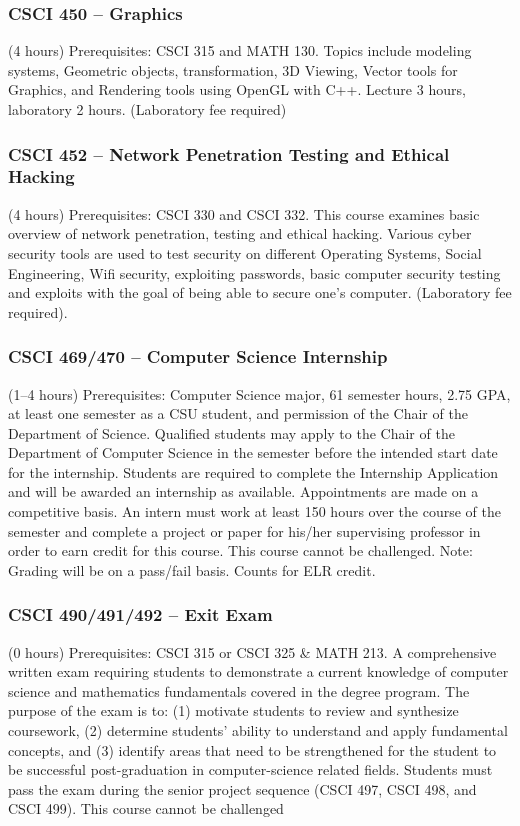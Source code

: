 \subsubsection{CSCI 450 -- Graphics}%
\label{course:CSCI:450}
(4 hours) Prerequisites: CSCI 315 and MATH 130. Topics include modeling systems, Geometric objects, transformation, 3D Viewing, Vector tools for Graphics, and Rendering tools using OpenGL with C++. Lecture 3 hours, laboratory 2 hours. (Laboratory fee required)

\subsubsection{CSCI 452 -- Network Penetration Testing and Ethical Hacking}%
\label{course:CSCI:452}
(4 hours) Prerequisites: CSCI 330 and CSCI 332. This course examines basic overview of network penetration, testing and ethical hacking. Various cyber security tools are used to test security on different Operating Systems, Social Engineering, Wifi security, exploiting passwords, basic computer security testing and exploits with the goal of being able to secure one's computer. (Laboratory fee required).

\subsubsection{CSCI 469/470 -- Computer Science Internship}%
\label{course:CSCI:469}\label{course:CSCI:470}
(1--4 hours) Prerequisites: Computer Science major, 61 semester hours, 2.75 GPA, at least one semester as a CSU student, and permission of the Chair of the Department of Science. Qualified students may apply to the Chair of the Department of Computer Science in the semester before the intended start date for the internship. Students are required to complete the Internship Application and will be awarded an internship as available. Appointments are made on a competitive basis. An intern must work at least 150 hours over the course of the semester and complete a project or paper for his/her supervising professor in order to earn credit for this course. This course cannot be challenged. Note: Grading will be on a pass/fail basis. Counts for ELR credit.

\subsubsection{CSCI 490/491/492 -- Exit Exam}%
\label{course:CSCI:490}\label{course:CSCI:491}\label{course:CSCI:492}
(0 hours) Prerequisites: CSCI 315 or CSCI 325 \& MATH 213. A comprehensive written exam requiring students to demonstrate a current knowledge of computer science and mathematics fundamentals covered in the degree program. The purpose of the exam is to: (1) motivate students to review and synthesize coursework, (2) determine students’ ability to understand and apply fundamental concepts, and (3) identify areas that need to be strengthened for the student to be successful post-graduation in computer-science related fields. Students must pass the exam during the senior project sequence (CSCI 497, CSCI 498, and CSCI 499). This course cannot be challenged

